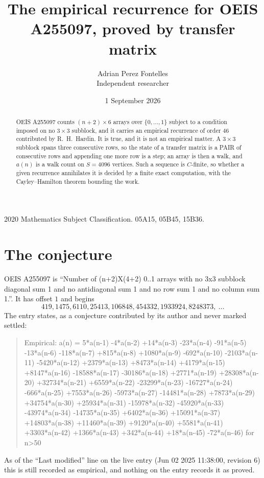 \documentclass[11pt,a4paper]{article}
\title{The empirical recurrence for OEIS A255097, proved by transfer matrix}
\author{Adrian Perez Fontelles\\ \small Independent researcher}
\date{1 September 2026}
\theoremstyle{plain}
\theoremstyle{definition}
\begin{document}
\maketitle

\begin{abstract}
OEIS A255097 counts $(n+2)\times6$ arrays over $\{0,\dots,1\}$ subject to a condition imposed on
no $3\times3$ subblock, and it carries an empirical recurrence of order $46$
contributed by R.~H.~Hardin. It is true, and it is not an empirical matter. A $3\times3$
subblock spans three consecutive rows, so the state of a transfer matrix is a PAIR of
consecutive rows and appending one more row is a step; an array is then a walk, and
$a(n)$ is a walk count on $S=4096$ vertices. Such a sequence is $C$-finite, so whether a given
recurrence annihilates it is decided by a finite exact computation, with the Cayley--Hamilton
theorem bounding the work.
\end{abstract}

\noindent\small 2020 Mathematics Subject Classification. 05A15, 05B45, 15B36.\normalsize

\section{The conjecture}

OEIS A255097 is ``Number of (n+2)X(4+2) 0..1 arrays with no 3x3 subblock diagonal sum 1 and no antidiagonal sum 1 and no row sum 1 and no column sum 1.''. It has offset $1$ and begins
\[
419, 1475, 6110, 25413, 106848, 454332, 1933924, 8248373,\ \dots
\]
The entry states, as a conjecture contributed by its author and never marked settled:
\begin{quote}
Empirical: a(n) = 5*a(n-1) -4*a(n-2) +14*a(n-3) -23*a(n-4) -91*a(n-5) -13*a(n-6) -118*a(n-7) +815*a(n-8) +1080*a(n-9) -692*a(n-10) -2103*a(n-11) -5420*a(n-12) +2379*a(n-13) +8473*a(n-14) +4179*a(n-15) +8147*a(n-16) -18588*a(n-17) -30186*a(n-18) +2771*a(n-19) +28308*a(n-20) +32734*a(n-21) +6559*a(n-22) -23299*a(n-23) -16727*a(n-24) -666*a(n-25) +7553*a(n-26) -5973*a(n-27) -14481*a(n-28) +7873*a(n-29) +34754*a(n-30) +25934*a(n-31) -15978*a(n-32) -45920*a(n-33) -43974*a(n-34) -14735*a(n-35) +6402*a(n-36) +15091*a(n-37) +14803*a(n-38) +11460*a(n-39) +9120*a(n-40) +5581*a(n-41) +3303*a(n-42) +1366*a(n-43) +342*a(n-44) +18*a(n-45) -72*a(n-46) for n>50
\end{quote}
As of the ``Last modified'' line on the live entry (Jun 02 2025 11:38:00, revision 6) this is still
recorded as empirical, and nothing on the entry records it as proved.
\end{document}
